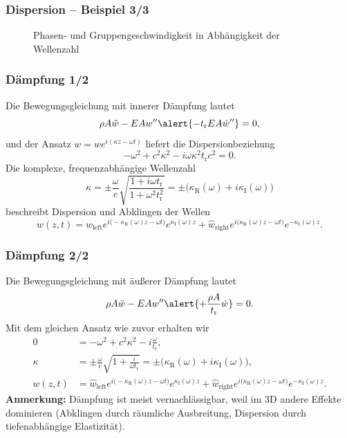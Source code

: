 \begin{frame}
\frametitle{Dispersion -- Beispiel 3/3} 
\begin{figure}

\caption*{Phasen- und Gruppengeschwindigkeit in Abhängigkeit der Wellenzahl}
\end{figure}
\end{frame}

\begin{frame}
\frametitle{Dämpfung 1/2}
Die Bewegungsgleichung mit \alert{innerer Dämpfung} lautet
\begin{equation*}
\rho A \ddot{w} - EA w'' \alert{-t_\mathrm{r} EA \dot{w}''}=0,
\end{equation*}
und der Ansatz $w=\hat{w}e^{i(\kappa z-\omega t)}$ liefert die Dispersionbeziehung
\begin{equation*}
 -\omega^2+c^2\kappa^2-i\omega\kappa^2t_\mathrm{r}c^2=0.
\end{equation*}
Die komplexe, frequenzabhängige Wellenzahl
\begin{equation*}
\kappa=\pm \frac{\omega}{c}\sqrt{\frac{1+i\omega t_\mathrm{r}}{1+\omega^2t_\mathrm{r}^2}}=\pm\bigl(\kappa_\mathrm{R}(\omega)+i\kappa_\mathrm{I}(\omega)\bigr)
\end{equation*}
beschreibt Dispersion und Abklingen der Wellen
\begin{equation*}
 w(z,t)=\hat{w}_\mathrm{left}e^{i\bigl(-\kappa_\mathrm{R}(\omega) z-\omega t\bigr)}e^{\kappa_\mathrm{I}(\omega) z}
 +\hat{w}_\mathrm{right}e^{i\bigl(\kappa_\mathrm{R}(\omega) z-\omega t\bigr)}e^{-\kappa_\mathrm{I}(\omega) z} .
\end{equation*}
\end{frame}

\begin{frame}
\frametitle{Dämpfung 2/2}
Die Bewegungsgleichung mit \alert{äußerer Dämpfung} lautet
\begin{equation*}
\rho A \ddot{w} - EA w'' \alert{+ \frac{\rho A}{t_\mathrm{r}}\dot{w}}=0.
\end{equation*}
Mit dem gleichen Ansatz wie zuvor erhalten wir
\begin{align*}
 0 &= -\omega^2+c^2\kappa^2-i\frac{\omega}{t_\mathrm{r}} , \\
\kappa &= \pm \frac{\omega}{c}\sqrt{1+\frac{i}{\omega t_\mathrm{r}}}=\pm\bigl(\kappa_\mathrm{R}(\omega)+i\kappa_\mathrm{I}(\omega)\bigr) , \\
w(z,t)&=\hat{w}_\mathrm{left}e^{i\bigl(-\kappa_\mathrm{R}(\omega) z-\omega t\bigr)}e^{\kappa_\mathrm{I}(\omega) z}
 +\hat{w}_\mathrm{right}e^{i\bigl(\kappa_\mathrm{R}(\omega) z-\omega t\bigr)}e^{-\kappa_\mathrm{I}(\omega) z} .
\end{align*}
\textbf{Anmerkung:} Dämpfung ist meist vernachlässigbar, weil im 3D andere Effekte dominieren (Abklingen durch räumliche Ausbreitung, Dispersion durch tiefenabhängige Elastizität). 
\end{frame}

